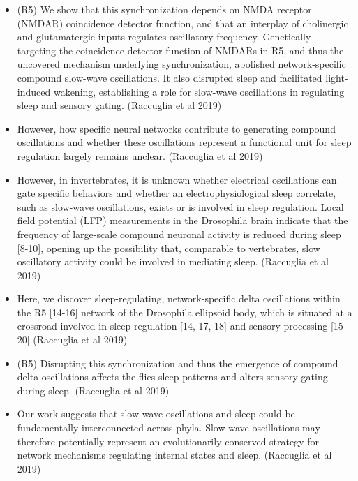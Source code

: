 \documentclass[11pt]{article}
\begin{document}
\begin{itemize}
    \item (R5) We show that this synchronization depends on NMDA receptor (NMDAR) coincidence detector function, and that an interplay of cholinergic and glutamatergic inputs regulates oscillatory frequency.
    Genetically targeting the coincidence detector function of NMDARs in R5, and thus the uncovered mechanism underlying synchronization, abolished network-specific compound slow-wave oscillations. It also disrupted sleep and facilitated light-induced wakening, establishing a role for slow-wave oscillations in regulating sleep and sensory gating.
    \parencite{raccugliaNetworkSpecificSynchronizationElectrical2019} (Raccuglia et al 2019)

    \item However, how specific neural networks contribute to generating compound oscillations and whether these oscillations represent a functional unit for sleep regulation largely remains unclear.
    \parencite{raccugliaNetworkSpecificSynchronizationElectrical2019} (Raccuglia et al 2019)

    \item However, in invertebrates, it is unknown whether electrical oscillations can gate specific behaviors and whether an electrophysiological sleep correlate, such as slow-wave oscillations, exists or is involved in sleep regulation. Local field potential (LFP) measurements in the Drosophila brain indicate that the frequency of large-scale compound neuronal activity is reduced during sleep [8-10], opening up the possibility that, comparable to vertebrates, slow oscillatory activity could be involved in mediating sleep.
    \parencite{raccugliaNetworkSpecificSynchronizationElectrical2019} (Raccuglia et al 2019)

    \item Here, we discover sleep-regulating, network-specific delta oscillations within the R5 [14-16] network of the Drosophila ellipsoid body, which is situated at a crossroad involved in sleep
    regulation [14, 17, 18] and sensory processing [15-20]
    \parencite{raccugliaNetworkSpecificSynchronizationElectrical2019} (Raccuglia et al 2019)

    \item (R5) Disrupting this synchronization and thus the emergence of compound delta oscillations affects the flies sleep patterns and alters sensory gating during sleep.
    \parencite{raccugliaNetworkSpecificSynchronizationElectrical2019} (Raccuglia et al 2019)

    \item Our work suggests that slow-wave oscillations and sleep could be fundamentally interconnected across phyla. Slow-wave oscillations may therefore potentially represent an evolutionarily conserved strategy for network mechanisms regulating internal states and sleep.
    \parencite{raccugliaNetworkSpecificSynchronizationElectrical2019} (Raccuglia et al 2019)


\end{itemize}
\end{document}
